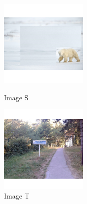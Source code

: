 \documentclass{article}
\begin{document}
\begin{figure}[!htb]
   \begin{minipage}{0.33\textwidth}
     \centering
     \includegraphics[width = 120pt]{Annexe/OursS.png}
     \caption{Image S}
      \end{minipage}\hfill
   \begin{minipage}{0.33\textwidth}
     \centering
     \includegraphics[width = 120pt]{Annexe/OursT.png}
     \caption{Image T}
      \end{minipage}\hfill
      \end{figure}
\end{document}
